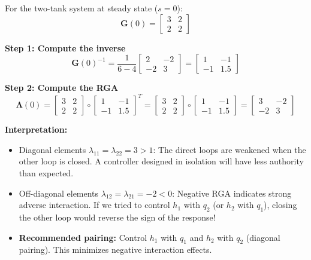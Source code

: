 \begin{example}
\label{ex:rga_two_tank}
For the two-tank system at steady state ($s = 0$):
\begin{equation}
\mathbf{G}(0) = \begin{bmatrix} 3 & 2 \\ 2 & 2 \end{bmatrix}
\end{equation}

\textbf{Step 1: Compute the inverse}
\begin{equation}
\mathbf{G}(0)^{-1} = \frac{1}{6-4}\begin{bmatrix} 2 & -2 \\ -2 & 3 \end{bmatrix} = \begin{bmatrix} 1 & -1 \\ -1 & 1.5 \end{bmatrix}
\end{equation}

\textbf{Step 2: Compute the RGA}
\begin{equation}
\boldsymbol{\Lambda}(0) = \begin{bmatrix} 3 & 2 \\ 2 & 2 \end{bmatrix} \circ \begin{bmatrix} 1 & -1 \\ -1 & 1.5 \end{bmatrix}^T = \begin{bmatrix} 3 & 2 \\ 2 & 2 \end{bmatrix} \circ \begin{bmatrix} 1 & -1 \\ -1 & 1.5 \end{bmatrix} = \begin{bmatrix} 3 & -2 \\ -2 & 3 \end{bmatrix}
\end{equation}

\textbf{Interpretation:}
\begin{itemize}
\item Diagonal elements $\lambda_{11} = \lambda_{22} = 3 > 1$: The direct loops are weakened when the other loop is closed. A controller designed in isolation will have less authority than expected.

\item Off-diagonal elements $\lambda_{12} = \lambda_{21} = -2 < 0$: Negative RGA indicates strong adverse interaction. If we tried to control $h_1$ with $q_2$ (or $h_2$ with $q_1$), closing the other loop would reverse the sign of the response!

\item \textbf{Recommended pairing:} Control $h_1$ with $q_1$ and $h_2$ with $q_2$ (diagonal pairing). This minimizes negative interaction effects.
\end{itemize}
\end{example}

